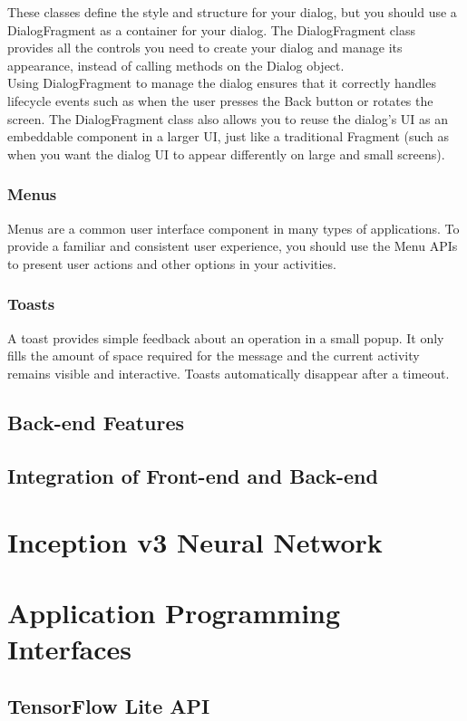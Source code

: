 \documentclass[14pt]{report}
\begin{document}
					These classes define the style and structure for your dialog, but you should use a DialogFragment as a container for your dialog. The DialogFragment class provides all the controls you need to create your dialog and manage its appearance, instead of calling methods on the Dialog object.\\
					
					Using DialogFragment to manage the dialog ensures that it correctly handles lifecycle events such as when the user presses the Back button or rotates the screen. The DialogFragment class also allows you to reuse the dialog's UI as an embeddable component in a larger UI, just like a traditional Fragment (such as when you want the dialog UI to appear differently on large and small screens).
			
				\subsubsection{Menus}
					Menus are a common user interface component in many types of applications. To provide a familiar and consistent user experience, you should use the Menu APIs to present user actions and other options in your activities.

				\subsubsection{Toasts}
					A toast provides simple feedback about an operation in a small popup. It only fills the amount of space required for the message and the current activity remains visible and interactive. Toasts automatically disappear after a timeout.
			\subsection{Back-end Features}
			\subsection{Integration of Front-end and Back-end}
		\section{Inception v3 Neural Network}
		\section{Application Programming Interfaces}
			\subsection{TensorFlow Lite API}
\end{document}
